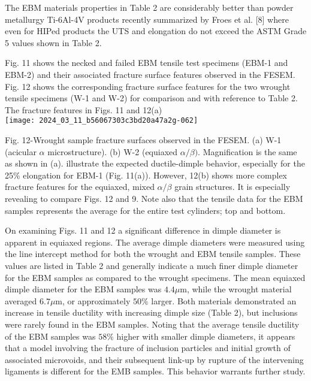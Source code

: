 \documentclass[10pt]{article}
\begin{document}
The EBM materials properties in Table 2 are considerably better than powder metallurgy Ti-6Al-4V products recently summarized by Froes et al. [8] where even for HIPed products the UTS and elongation do not exceed the ASTM Grade 5 values shown in Table 2.

Fig. 11 shows the necked and failed EBM tensile test specimens (EBM-1 and EBM-2) and their associated fracture surface features observed in the FESEM. Fig. 12 shows the corresponding fracture surface features for the two wrought tensile specimens (W-1 and W-2) for comparison and with reference to Table 2. The fracture features in Figs. 11 and 12(a)\\
\texttt{[image: 2024\_03\_11\_b56067303c3bd20a47a2g-062]}

Fig. 12-Wrought sample fracture surfaces observed in the FESEM. (a) W-1 (acicular $\alpha$ microstructure). (b) W-2 (equiaxed $\alpha / \beta)$. Magnification is the same as shown in (a). illustrate the expected ductile-dimple behavior, especially for the 25\% elongation for EBM-1 (Fig. 11(a)). However, 12(b) shows more complex fracture features for the equiaxed, mixed $\alpha / \beta$ grain structures. It is especially revealing to compare Figs. 12 and 9. Note also that the tensile data for the EBM samples represents the average for the entire test cylinders; top and bottom.

On examining Figs. 11 and 12 a significant difference in dimple diameter is apparent in equiaxed regions. The average dimple diameters were measured using the line intercept method for both the wrought and EBM tensile samples. These values are listed in Table 2 and generally indicate a much finer dimple diameter for the EBM samples as compared to the wrought specimens. The mean equiaxed dimple diameter for the EBM samples was $4.4 \mu \mathrm{m}$, while the wrought material averaged $6.7 \mu \mathrm{m}$, or approximately $50 \%$ larger. Both materials demonstrated an increase in tensile ductility with increasing dimple size (Table 2), but inclusions were rarely found in the EBM samples. Noting that the average tensile ductility of the EBM samples was $58 \%$ higher with smaller dimple diameters, it appears that a model involving the fracture of inclusion particles and initial growth of associated microvoids, and their subsequent link-up by rupture of the intervening ligaments is different for the EMB samples. This behavior warrants further study.
\end{document}
